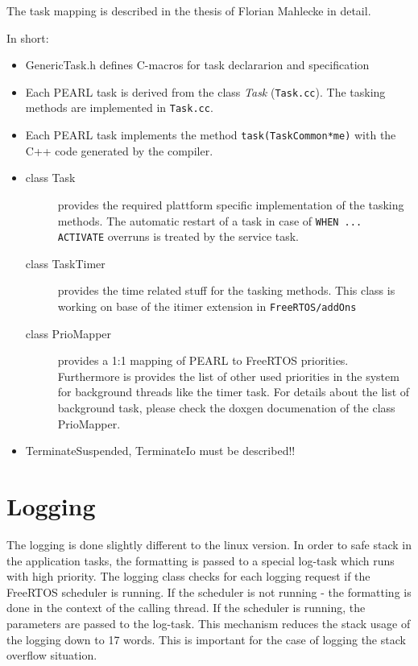 The task mapping is described in the thesis of
 Florian Mahlecke in detail.

In short:
\begin{itemize}
\item GenericTask.h defines C-macros for task declararion and specification
\item Each PEARL task is derived from the class {\em Task} (\verb|Task.cc|).
      The tasking methods are implemented in \verb|Task.cc|.
\item Each PEARL task implements the method \verb|task(TaskCommon*me)| 
    with the C++ code generated by the compiler.
\item {
  \begin{description}
  \item[class Task] provides the required plattform specific implementation
     of the tasking methods. The automatic restart of a task in case of
     \verb|WHEN ... ACTIVATE| overruns is treated by the service task.
  \item[class TaskTimer] provides the time related stuff for the tasking
     methods. This class is working on base of the itimer extension 
     in \texttt{FreeRTOS/addOns}
  \item[class PrioMapper] provides a 1:1 mapping of PEARL to FreeRTOS
      priorities. Furthermore is provides the list of other used
      priorities in the system for background threads like the timer task.
      For details about the list of background task, please 
      check the doxgen documenation of the class PrioMapper.
  \end{description}
}
\item TerminateSuspended, TerminateIo must be described!!
\end{itemize}


\section{Logging}
The logging is done slightly different to the linux version.
In order to safe stack in the application tasks, the formatting is passed
to a special log-task which runs with high priority.
The logging class checks for each logging request if the FreeRTOS scheduler
is running. If the scheduler is not running - the formatting is done in the 
context of the calling thread. If the scheduler is running, the parameters
are passed to the log-task.
This mechanism reduces the stack usage of the logging down to 17 words. This
is important for the case of logging the stack overflow situation.


